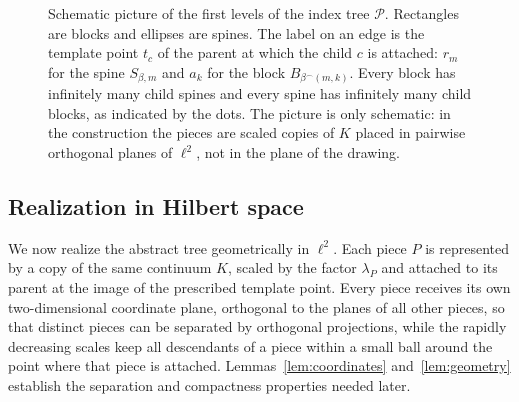 \documentclass[11pt]{amsart}
\theoremstyle{definition}
\theoremstyle{remark}
\newcommand{\Pc}{\mathcal{P}}
\begin{document}
\begin{figure}[ht]
\centering
{}
\caption{Schematic picture of the first levels of the index tree $\Pc$. Rectangles are blocks and ellipses are spines. The label on an edge is the template point $t_c$ of the parent at which the child $c$ is attached: $r_m$ for the spine $S_{\beta,m}$ and $a_k$ for the block $B_{\beta^\frown(m,k)}$. Every block has infinitely many child spines and every spine has infinitely many child blocks, as indicated by the dots. The picture is only schematic: in the construction the pieces are scaled copies of $K$ placed in pairwise orthogonal planes of $\ell^2$, not in the plane of the drawing.}
\label{fig:tree}
\end{figure}

\subsection{Realization in Hilbert space}\label{subsec:realization}
We now realize the abstract tree geometrically in $\ell^2$. Each piece $P$ is represented by a copy of the same continuum $K$, scaled by the factor $\lambda_P$ and attached to its parent at the image of the prescribed template point. Every piece receives its own two-dimensional coordinate plane, orthogonal to the planes of all other pieces, so that distinct pieces can be separated by orthogonal projections, while the rapidly decreasing scales keep all descendants of a piece within a small ball around the point where that piece is attached. Lemmas~\ref{lem:coordinates} and~\ref{lem:geometry} establish the separation and compactness properties needed later.
\end{document}
